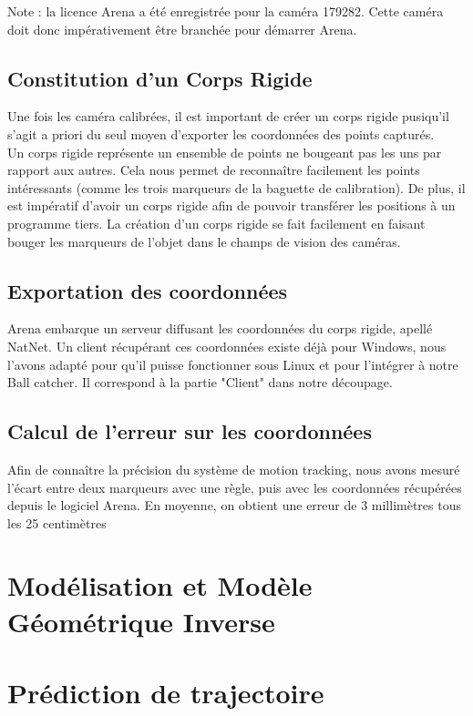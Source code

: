 \documentclass{article}[11pt]
\begin{document}
Note : la licence Arena a été enregistrée pour la caméra 179282. Cette caméra doit donc impérativement être branchée pour démarrer Arena.

\subsection{Constitution d'un Corps Rigide}

Une fois les caméra calibrées, il est important de créer un corps rigide pusiqu'il s'agit a priori du seul moyen d'exporter les coordonnées des points capturés. \\

Un corps rigide représente un ensemble de points ne bougeant pas les uns par rapport aux autres. Cela nous permet de reconnaître facilement les points intéressants (comme les trois marqueurs de la baguette de calibration). De plus, il est impératif d'avoir un corps rigide afin de pouvoir transférer les positions à un programme tiers. La création d'un corps rigide se fait facilement en faisant bouger les marqueurs de l'objet dans le champs de vision des caméras.

\subsection{Exportation des coordonnées}

Arena embarque un serveur diffusant les coordonnées du corps rigide, apellé NatNet. Un client récupérant ces coordonnées existe déjà pour Windows, nous l'avons adapté pour qu'il puisse fonctionner sous Linux et pour l'intégrer à notre Ball catcher. Il correspond à la partie "Client" dans notre découpage.

\subsection{Calcul de l'erreur sur les coordonnées}
Afin de connaître la précision du système de motion tracking, nous avons mesuré l'écart entre deux marqueurs avec une règle, puis avec les coordonnées récupérées depuis le logiciel Arena. En moyenne, on obtient une erreur de 3 millimètres tous les 25 centimètres 
\newpage
\section{Modélisation et Modèle Géométrique Inverse}


\section{Prédiction de trajectoire}

\end{document}
